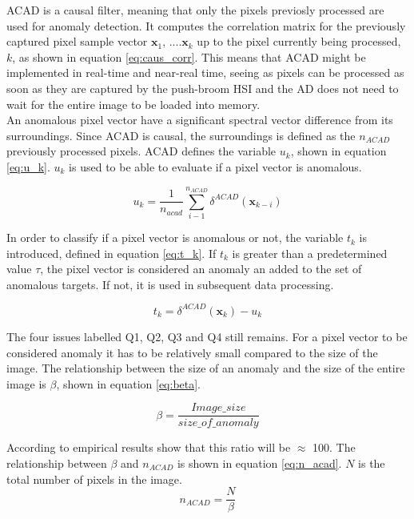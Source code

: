 ACAD is a causal filter, meaning that only the pixels previosly processed are used for anomaly detection.  It computes the correlation matrix for the previously captured pixel sample vector {$\textbf{x}_1$, ....$\textbf{x}_k$} up to the pixel currently being processed, $k$, as shown in equation \ref{eq:caus_corr}. This means that ACAD might be implemented in real-time and near-real time, seeing as pixels can be processed as soon as they are captured by the push-broom HSI and the AD does not need to wait for the entire image to be loaded into memory. \\

An anomalous pixel vector have a significant spectral vector difference from its surroundings. Since ACAD is causal, the surroundings is defined as the $n_{ACAD}$ previously processed pixels. %
ACAD defines the variable $u_k$, shown in equation \ref{eq:u_k}. $u_k$ is used to be able to evaluate if a pixel vector is anomalous. 

\begin{equation}
    u_k = \frac{1}{n_{acad}}\sum_{i-1}^{n_{ACAD}}  \delta^{ACAD}(\textbf{x}_{k-i})
    \label{eq:u_k}
\end{equation}

In order to classify if a pixel vector is anomalous or not, the variable $t_k$ is introduced, defined in equation \ref{eq:t_k}. If $t_k$ is greater than a predetermined value $\tau$, the pixel vector is considered an anomaly an added to the set of anomalous targets. If not, it is used in subsequent data processing. 

\begin{equation}
    t_k = \delta^{ACAD}(\textbf{x}_{k}) - u_k
    \label{eq:t_k}
\end{equation}


The four issues labelled Q1, Q2, Q3 and Q4 still remains. For a pixel vector to be considered anomaly it has to be relatively small compared to the size of the image. The relationship between the size of an anomaly and the size of the entire image is $\beta$, shown in equation \ref{eq:beta}.

\begin{equation}
    \beta  = \frac{Image\_size}{size\_of\_anomaly}
    \label{eq:beta}
\end{equation}

According to \cite{chang2006characterization} empirical results show that this ratio will be $\approx$ 100.
The relationship between $\beta$ and $n_{ACAD}$ is shown in equation \ref{eq:n_acad}. $N$ is the total number of pixels in the image. 
\begin{equation}
    n_{ACAD} = \frac{N}{\beta}
    \label{eq:n_acad}
\end{equation}

